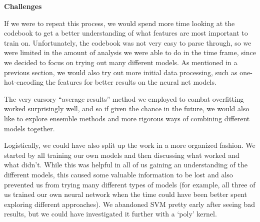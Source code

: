 \vspace{1ex}
\noindent
\textbf{Challenges}

\noindent
If we were to repeat this process, we would spend more time looking at the codebook to get a better understanding of what features are most important to train on. Unfortunately, the codebook was not very easy to parse through, so we were limited in the amount of analysis we were able to do in the time frame, since we decided to focus on trying out many different models. As mentioned in a previous section, we would also try out more initial data processing, such as one-hot-encoding the features for better results on the neural net models.

\noindent
The very cursory “average results” method we employed to combat overfitting worked surprisingly well, and so if given the chance in the future, we would also like to explore ensemble methods and more rigorous ways of combining different models together.

\noindent
Logistically, we could have also split up the work in a more organized fashion. We started by all training our own models and then discussing what worked and what didn’t. While this was helpful in all of us gaining an understanding of the different models, this caused some valuable information to be lost and also prevented us from trying many different types of models (for example, all three of us trained our own neural network when the time could have been better spent exploring different approaches). We abandoned SVM pretty early after seeing bad results, but we could have investigated it further with a ‘poly’ kernel.



